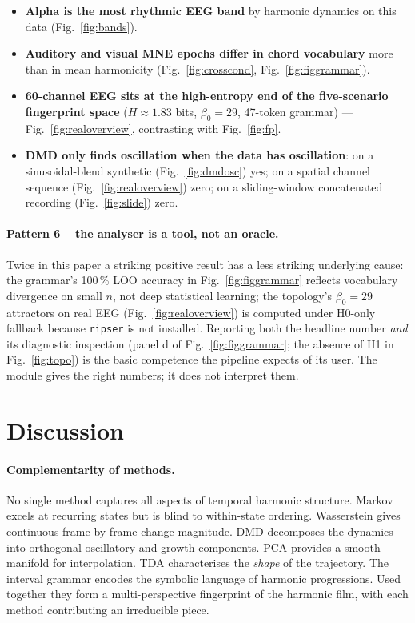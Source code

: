 \documentclass[11pt,a4paper]{article}
\begin{document}
\begin{itemize}[nosep,leftmargin=*]
  \item \textbf{Alpha is the most rhythmic EEG band} by harmonic
        dynamics on this data (Fig.~\ref{fig:bands}).
  \item \textbf{Auditory and visual MNE epochs differ in chord
        vocabulary} more than in mean harmonicity
        (Fig.~\ref{fig:crosscond}, Fig.~\ref{fig:figgrammar}).
  \item \textbf{60-channel EEG sits at the high-entropy end of the
        five-scenario fingerprint space} ($H \approx 1.83$ bits,
        $\beta_0 = 29$, 47-token grammar) ---
        Fig.~\ref{fig:realoverview}, contrasting with
        Fig.~\ref{fig:fp}.
  \item \textbf{DMD only finds oscillation when the data has
        oscillation}: on a sinusoidal-blend synthetic
        (Fig.~\ref{fig:dmdosc}) yes; on a spatial channel sequence
        (Fig.~\ref{fig:realoverview}) zero; on a sliding-window
        concatenated recording (Fig.~\ref{fig:slide}) zero.
\end{itemize}

\paragraph{Pattern 6 -- the analyser is a tool, not an oracle.}
Twice in this paper a striking positive result has a less striking
underlying cause: the grammar's 100\,\% LOO accuracy in
Fig.~\ref{fig:figgrammar} reflects vocabulary divergence on small
$n$, not deep statistical learning; the topology's $\beta_0 = 29$
attractors on real EEG (Fig.~\ref{fig:realoverview}) is computed
under H0-only fallback because \texttt{ripser} is not installed.
Reporting both the headline number \emph{and} its diagnostic
inspection (panel d of Fig.~\ref{fig:figgrammar}; the absence of H1
in Fig.~\ref{fig:topo}) is the basic competence the pipeline expects
of its user. The module gives the right numbers; it does not
interpret them.

\section{Discussion}

\paragraph{Complementarity of methods.} No single method captures all
aspects of temporal harmonic structure. Markov excels at recurring
states but is blind to within-state ordering. Wasserstein gives
continuous frame-by-frame change magnitude. DMD decomposes the
dynamics into orthogonal oscillatory and growth components. PCA
provides a smooth manifold for interpolation. TDA characterises the
\emph{shape} of the trajectory. The interval grammar encodes the
symbolic language of harmonic progressions. Used together they form a
multi-perspective fingerprint of the harmonic film, with each method
contributing an irreducible piece.
\end{document}
